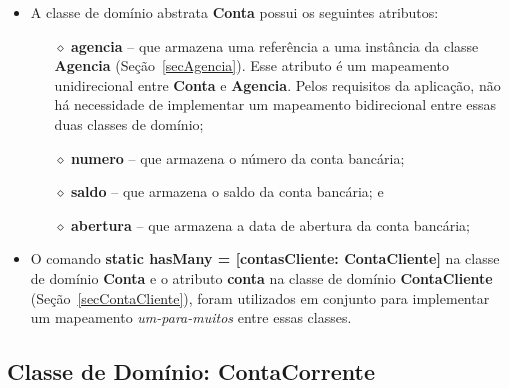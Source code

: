 \begin{itemize}

\item A classe de domínio abstrata {\bf Conta} possui os seguintes atributos:

\vspace{0.5cm}

\begin{itemize}

\item[$\diamond$] {\bf agencia}  -- que armazena uma referência  a uma instância
  da  classe  {\bf  Agencia}   (Seção~\ref{secAgencia}).   Esse  atributo  é  um
  mapeamento unidirecional entre {\bf  Conta} e {\bf Agencia}.  Pelos requisitos
  da  aplicação, não há  necessidade de  implementar um  mapeamento bidirecional
  entre essas duas classes de domínio;

\vspace{0.5cm}

\item[$\diamond$] {\bf numero} -- que armazena o número da conta bancária; 

\vspace{0.5cm}

\item[$\diamond$] {\bf saldo} -- que armazena o saldo da conta bancária; e

\vspace{0.5cm}

\item[$\diamond$] {\bf  abertura} --  que armazena a  data de abertura  da conta
  bancária; 

\end{itemize}

\vspace{0.5cm}

\item O comando  {\bf static hasMany = [contasCliente:  ContaCliente]} na classe
  de domínio  {\bf Conta}  e o atributo  {\bf conta}  na classe de  domínio {\bf
    ContaCliente}  (Seção~\ref{secContaCliente}), foram  utilizados  em conjunto
  para implementar um mapeamento {\em um-para-muitos} entre essas classes.

\end{itemize}

\newpage

\subsection{Classe de Domínio: ContaCorrente}\label{secContaCorrente}

